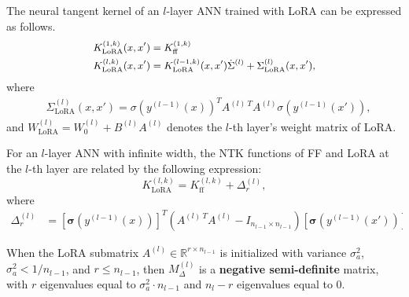 \documentclass[final,hyperref={pdfpagelabels=false}]{beamer}
\begin{document}
\begin{frame}[t]
\begin{columns}[t]
\begin{column}{.34\textwidth}
\begin{lemma}\label{lemma:ntk-lora}
The neural tangent kernel of an $l$-layer ANN trained with
LoRA can be expressed as follows.
\begin{equation}\small
\label{eq:kntk}
\begin{aligned}
&K_{\text{LoRA}}^{(1,k)}(x,x')=K_{\text{ff}}^{(1,k)}\\
&K_{\text{LoRA}}^{(l,k)}(x,x')=K_{\text{LoRA}}^{(l-1,k)}(x,x') \dot{\Sigma}^{(l)}+\Sigma_{\text{LoRA}}^{(l)}(x,x'),
\end{aligned}
\end{equation}
where
\begin{equation*}
\label{eq:cov-ntk}
\begin{aligned}
&\Sigma^{(l)}_{\text{LoRA}}(x,x')=\sigma(y^{(l-1)}(x))^{T}A^{(l)~T}A^{(l)}\sigma(y^{(l-1)}(x')),
\end{aligned}
\end{equation*}
and
$W_{\text{LoRA}}^{(l)}=W_{0}^{(l)}+B^{(l)}A^{(l)}$ denotes the $l$-th
layer's weight matrix of LoRA.
\end{lemma}


\begin{theorem}
\label{th:rel}
  For an $l$-layer ANN with infinite width, the NTK functions of FF
  and LoRA at the $l$-th layer are related by the following expression:
\begin{equation}
\label{eq:rel}
K_{\text{LoRA}}^{(l,k)}=K_{\text{ff}}^{(l,k)}+\Delta_{r}^{(l)},
\end{equation}
where
\begin{equation*}
  \begin{aligned}
\Delta_{r}^{(l)}&= [ \mathbf{\sigma} ( y^{(l-1)}(x) )
]^{T}(A^{(l)~T}A^{(l)}-I_{n_{l-1}\times n_{l-1}}) [ \mathbf{\sigma} ( y^{(l-1)}(x') ) ].
  \end{aligned}
\end{equation*}
\end{theorem}

\begin{theorem}
  \label{th:delta-nsd}
  When the LoRA submatrix $A^{(l)}\in\mathbb{R}^{r\times n_{l-1}}$ is initialized with
  variance $\sigma_{a}^{2}$, $\sigma_{a}^{2}<1/n_{l-1}$, and
  $r\leq n_{l-1}$, then $M_{\Delta}^{(l)}$ is
  a \textbf{negative semi-definite} matrix, with $r$ eigenvalues
  equal to $\sigma_{a}^{2}\cdot n_{l-1}$ and $n_{l}-r$ eigenvalues
  equal to $0$.
\end{theorem}


\end{column}
\end{columns}
\end{frame}
\end{document}
